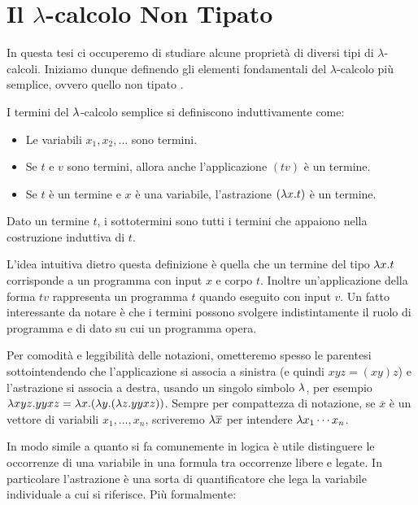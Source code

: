 \documentclass[]{marticle}
\begin{document}
\section{Il $\lambda$-calcolo Non Tipato}

In questa tesi ci occuperemo di studiare alcune propriet\`a di diversi tipi
di $\lambda$-calcoli. Iniziamo dunque definendo gli elementi fondamentali del
$\lambda$-calcolo pi\`u semplice, ovvero quello non tipato \cite{baren}.

\begin{block}[Definizione]
    I termini del $\lambda$-calcolo semplice si definiscono induttivamente come:
    \begin{itemize}
        \item Le variabili $x_1, x_2, \dots$ sono termini.
        \item Se $t$ e $v$ sono termini, allora anche l'applicazione $(tv)$ \`e
            un termine.
        \item Se $t$ \`e un termine e $x$ \`e una variabile, l'astrazione $(\lambda
            x.  t)$ \`e un termine.
    \end{itemize}

    Dato un termine $t$, i sottotermini sono tutti i termini che appaiono nella
    costruzione induttiva di $t$.
\end{block}

L'idea intuitiva dietro questa definizione \`e quella che un termine del tipo
$\lambda x.t$ corrisponde a un programma con input $x$ e corpo $t$. Inoltre
un'applicazione della forma $tv$ rappresenta  un programma $t$ quando eseguito
con input $v$. Un fatto interessante da notare \`e che i termini possono
svolgere indistintamente il ruolo di programma e di dato su cui un programma
opera.

Per comodit\`a e leggibilit\`a delle notazioni, ometteremo spesso le parentesi
sottointendendo che l'applicazione si associa a sinistra (e quindi $xyz=(xy)z$)
e l'astrazione si associa a destra, usando un singolo simbolo $\lambda$, per esempio
$\lambda xyz.yyxz = \lambda x. (\lambda y. (\lambda z. yyxz))$. Sempre per compattezza di notazione,
se $\overline{x}$ \`e un vettore di variabili $x_1,\dots,x_n$, scriveremo $\lambda
\overline{x}$ per intendere $\lambda x_1\cdots x_n$.

In modo simile a quanto si fa comunemente in logica \`e utile distinguere le
occorrenze di una variabile in una formula tra occorrenze libere e legate. In
particolare l'astrazione \`e una sorta di quantificatore che lega la variabile
individuale a cui si riferisce. Pi\`u formalmente:
\end{document}
